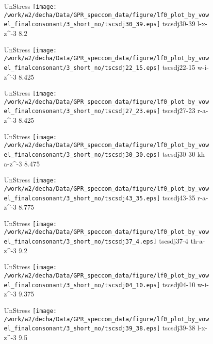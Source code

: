 \documentclass{article}
\begin{document}
\begin{figure}[t]
\begin{minipage}[b]{.24\textwidth}
UnStress
\centering
\texttt{[image: /work/w2/decha/Data/GPR\_speccom\_data/figure/lf0\_plot\_by\_vowel\_finalconsonant/3\_short\_no/tscsdj30\_39.eps]}
tscsdj30-39 l-x-z\textasciicircum-3 8.2
\end{minipage}
\begin{minipage}[b]{.24\textwidth}
UnStress
\centering
\texttt{[image: /work/w2/decha/Data/GPR\_speccom\_data/figure/lf0\_plot\_by\_vowel\_finalconsonant/3\_short\_no/tscsdj22\_15.eps]}
tscsdj22-15 w-i-z\textasciicircum-3 8.425
\end{minipage}
\begin{minipage}[b]{.24\textwidth}
UnStress
\centering
\texttt{[image: /work/w2/decha/Data/GPR\_speccom\_data/figure/lf0\_plot\_by\_vowel\_finalconsonant/3\_short\_no/tscsdj27\_23.eps]}
tscsdj27-23 r-a-z\textasciicircum-3 8.425
\end{minipage}
\begin{minipage}[b]{.24\textwidth}
UnStress
\centering
\texttt{[image: /work/w2/decha/Data/GPR\_speccom\_data/figure/lf0\_plot\_by\_vowel\_finalconsonant/3\_short\_no/tscsdj30\_30.eps]}
tscsdj30-30 kh-a-z\textasciicircum-3 8.475
\end{minipage}
\end{figure}
\clearpage
\begin{figure}[t]
\begin{minipage}[b]{.24\textwidth}
UnStress
\centering
\texttt{[image: /work/w2/decha/Data/GPR\_speccom\_data/figure/lf0\_plot\_by\_vowel\_finalconsonant/3\_short\_no/tscsdj43\_35.eps]}
tscsdj43-35 r-a-z\textasciicircum-3 8.775
\end{minipage}
\begin{minipage}[b]{.24\textwidth}
UnStress
\centering
\texttt{[image: /work/w2/decha/Data/GPR\_speccom\_data/figure/lf0\_plot\_by\_vowel\_finalconsonant/3\_short\_no/tscsdj37\_4.eps]}
tscsdj37-4 th-a-z\textasciicircum-3 9.2
\end{minipage}
\begin{minipage}[b]{.24\textwidth}
UnStress
\centering
\texttt{[image: /work/w2/decha/Data/GPR\_speccom\_data/figure/lf0\_plot\_by\_vowel\_finalconsonant/3\_short\_no/tscsdj04\_10.eps]}
tscsdj04-10 w-i-z\textasciicircum-3 9.375
\end{minipage}
\begin{minipage}[b]{.24\textwidth}
UnStress
\centering
\texttt{[image: /work/w2/decha/Data/GPR\_speccom\_data/figure/lf0\_plot\_by\_vowel\_finalconsonant/3\_short\_no/tscsdj39\_38.eps]}
tscsdj39-38 l-x-z\textasciicircum-3 9.5
\end{minipage}
\end{figure}
\end{document}
